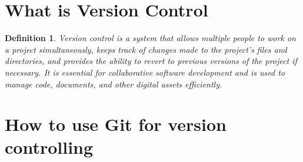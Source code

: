 \documentclass[11pt]{article}
\newtheorem{dfn}[thm]{Definition}
\begin{document}
\section{What is Version Control}

\begin{dfn}
    Version control is a system that allows multiple people to work on a project simultaneously, keeps track of changes made to the project's files and directories, and provides the ability to revert to previous versions of the project if necessary. It is essential for collaborative software development and is used to manage code, documents, and other digital assets efficiently.
\end{dfn}

\section{How to use Git for version controlling}
\end{document}
